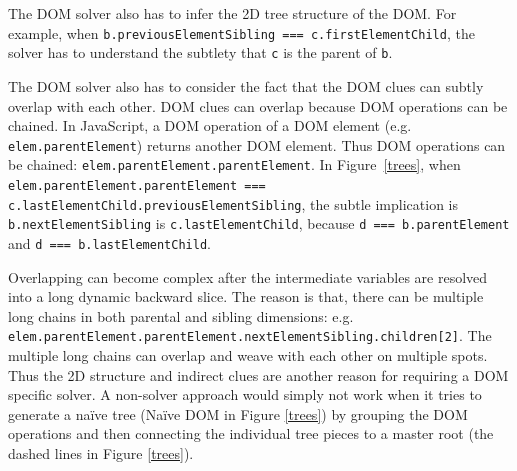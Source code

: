 The DOM solver also has to infer the 2D tree structure of the DOM.  For example, when {\tt b.previousElementSibling === c.firstElementChild}, the solver has to understand the subtlety that {\tt c} is the parent of {\tt b}.  

The DOM solver also has to consider the fact that the DOM clues can subtly overlap with each other.  DOM clues can overlap because DOM operations can be chained.  In JavaScript, a DOM operation of a DOM element (e.g. {\tt elem.parentElement}) returns another DOM element.  Thus DOM operations can be chained: {\tt elem.parentElement.parentElement}.  
In Figure~\ref{trees}, when {\tt elem.parentElement.parentElement === c.lastElementChild.previousElementSibling}, the subtle implication is {\tt b.nextElementSibling} is {\tt c.lastElementChild}, because {\tt d === b.parentElement} and {\tt d === b.lastElementChild}.  

Overlapping can become complex after the intermediate variables are resolved into a long dynamic backward slice.  The reason is that, there can be multiple long chains in both parental and sibling dimensions: e.g. {\tt elem.parentElement.parentElement.nextElementSibling.children[2]}.  
The multiple long chains can overlap and weave with each other on multiple spots.
Thus the 2D structure and indirect clues are another reason for requiring a DOM specific solver.  A non-solver approach would simply not work when it tries to generate a naïve tree (Naïve DOM in Figure \ref{trees}) by grouping the DOM operations and then connecting the individual tree pieces to a master root (the dashed lines in Figure \ref{trees}).  


